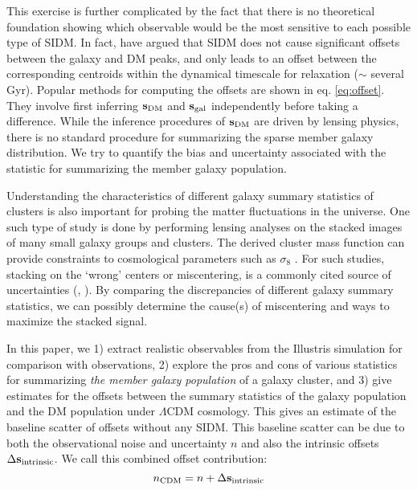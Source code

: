 
This exercise is further complicated by the fact that there is no theoretical
foundation showing which observable would be the most sensitive to each
possible type of SIDM. In fact, \cite{Kahlhoefer14} have argued that SIDM 
does not cause
significant offsets between the galaxy and DM peaks, and only leads to an offset
between the corresponding centroids within the dynamical timescale for
relaxation ($\sim$ several Gyr). 
Popular methods for computing the offsets are shown in eq. \ref{eq:offset}.
They involve first inferring ${\bf s}_{\rm DM}$ 
and ${\bf s}_{\rm gal}$ independently before taking a difference.
While the inference procedures of ${\bf s}_{\rm DM}$ are driven by lensing 
physics, there is no standard procedure for
summarizing the sparse member galaxy distribution. 
We try to quantify the bias and uncertainty associated with the
statistic for summarizing the member galaxy population. 

Understanding the characteristics of different galaxy
summary statistics of clusters is also important for  
probing the matter fluctuations in the universe. 
One such type of study is done by performing lensing analyses on the stacked images of 
many small galaxy groups and clusters. 
The derived cluster mass function can provide constraints to cosmological
parameters such as $\sigma_8$ \citep{George2012a}. 
For such studies, stacking on the `wrong' centers or miscentering, is a commonly cited
source of uncertainties (\citealt{Johnston2007b},
\citealt{Ford2014}). By comparing the discrepancies of different galaxy
summary statistics, we can possibly determine the  
cause(s) of miscentering and ways to maximize the stacked signal. 

In this paper, we 
1) extract realistic observables from the Illustris simulation for
comparison with observations, 2) explore the pros and cons of various statistics for 
summarizing {\it the member galaxy population} of a galaxy cluster, and 3)	
give estimates for the offsets between the summary statistics of the galaxy  
population and the DM population under $\Lambda$CDM cosmology.
This gives an estimate of the baseline scatter of offsets without any SIDM.
This baseline scatter can be due
to both the observational noise and uncertainty $n$ and also the intrinsic offsets 
$\Delta {\bf s}_{\rm intrinsic}$. We call this combined offset contribution:
\begin{equation}
	n_{\rm CDM} = n + \Delta {\bf s}_{\rm intrinsic}
\end{equation}

